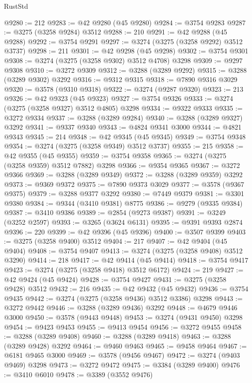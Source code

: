 \begin{lexlean}{RustStd}
\begin{coremodule}
@9280 := 212
@9283 := @42 @9280 (@45 @9280)
@9284 := @3754 @9283
@9287 := @3275 (@3258 @9284) @3512
@9288 := 210
@9291 := @42 @9288 (@45 @9288)
@9292 := @3754 @9291
@9297 := @3274 (@3275 (@3258 @9292) @3512 @3737)
@9298 := 211
@9301 := @42 @9298 (@45 @9298)
@9302 := @3754 @9301
@9308 := @3274 (@3275 (@3258 @9302) @3512 @4708) @3298
@9309 := @9297 @9308
@9310 := @3272 @9309
@9312 := @3288 (@3289 @9292)
@9315 := @3288 (@3289 @9302) @3292
@9316 := @9312 @9315
@9318 := @7890 @9316 @3029
@9320 := @3578 (@9310 @9318)
@9322 := @3274 (@9287 @9320)
@9323 := 213
@9326 := @42 @9323 (@45 @9323)
@9327 := @3754 @9326
@9333 := @3274 (@3275 (@3258 @9327) @3512 @4805) @3298
@9334 := @9322 @9333
@9335 := @3272 @9334
@9337 := @3288 (@3289 @9284)
@9340 := @3288 (@3289 @9327) @3292
@9341 := @9337 @9340
@9343 := @4824 @9341 @3000
@9344 := @4821 @9343
@9345 := 214
@9348 := @42 @9345 (@45 @9345)
@9349 := @3754 @9348
@9354 := @3274 (@3275 (@3258 @9349) @3512 @3737)
@9355 := 215
@9358 := @42 @9355 (@45 @9355)
@9359 := @3754 @9358
@9365 := @3274 (@3275 (@3258 @9359) @3512 @7882) @3298
@9366 := @9354 @9365
@9367 := @3272 @9366
@9369 := @3288 (@3289 @9349)
@9372 := @3288 (@3289 @9359) @3292
@9373 := @9369 @9372
@9375 := @7890 @9373 @3029
@9377 := @3578 (@9367 @9375)
@9379 := @3288 @9377 @3292
@9380 := @7449 @9379
@9381 := @3301 @9380
@9384 := @9344 (@3410 @9381) @8775
@9386 := @9279 (@9335 @9384)
@9387 := @3410 @9386
@9389 := @2854 (@9273 @9387)
@9391 := @3249 (@3252 @2597)
@9393 := @3265 (@3624 @6131)
@9395 := @9391 @9393 @2874
@9396 := 220
@9399 := @42 @9396 (@45 @9396)
@9400 := @3507 @9399
@9403 := @3275 (@3258 @9400) @3512
@9404 := 217
@9407 := @42 @9404 (@45 @9404)
@9408 := @3754 @9407
@9413 := @3274 (@3275 (@3258 @9408) @3512 @3290)
@9414 := 218
@9417 := @42 @9414 (@45 @9414)
@9418 := @3754 @9417
@9423 := @3274 (@3275 (@3258 @9418) @3512 @6172)
@9424 := 219
@9427 := @42 @9424 (@45 @9424)
@9428 := @3754 @9427
@9431 := @3275 (@3258 @9428) @3512
@9432 := 216
@9435 := @42 @9432 (@45 @9432)
@9436 := @3754 @9435
@9442 := @3274 (@3275 (@3258 @9436) @3512 @3386) @3298
@9443 := @3272 @9442
@9446 := @3288 (@3289 @9436) @3292
@9448 := @4679 @9446 @3000
@9450 := @3578 (@9443 @9448)
@9453 := @3274 (@9431 @9450) @3298
@9454 := @9423 @9453
@9455 := @9413 @9454
@9456 := @3272 @9455
@9458 := @3288 (@3289 @9408)
@9460 := @3288 (@3289 @9418)
@9463 := @3288 (@3289 @9428) @3292
@9464 := @9460 @9463
@9465 := @9458 @9464
@9467 := @6181 @9465 @3000
@9469 := @3578 (@9456 @9467)
@9472 := @3274 (@9403 @9469) @3298
@9473 := @3272 @9472
@9475 := @3384 (@3289 @9400)
@9476 := @3410 @6010
@9478 := @3389 (@3552 @9476)

\end{coremodule}
\end{lexlean}
